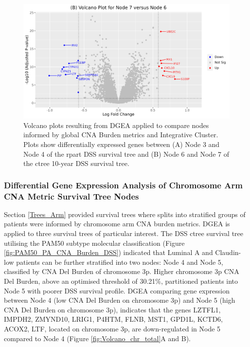 \begin{figure}[!ht]
\begin{center}
\begin{multicols}{2}
    \includegraphics[width=1\linewidth]{../figures/Chapter_4/Volcano_4.png}\par 
 
\end{multicols}
\caption[Volcano plots resulting from DGEA applied to compare nodes informed by global CNA Burden metrics and Integrative Cluster.]{Volcano plots resulting from DGEA applied to compare nodes informed by global CNA Burden metrics and Integrative Cluster. Plots show differentially expressed genes between (A) Node 3 and Node 4 of the rpart DSS survival tree and (B) Node 6 and Node 7 of the ctree 10-year DSS survival tree.}
\label{fig:DGEA_Global_VP_IC}
\end{center}
\end{figure}

\subsubsection{Differential Gene Expression Analysis of Chromosome Arm CNA Metric Survival Tree Nodes}
\label{Sec_limma_2}
Section \ref{Trees_Arm} provided survival trees where splits into stratified groups of patients were informed by chromosome arm CNA burden metrics. DGEA is applied to three survival trees of particular interest. The DSS ctree survival tree utilising the PAM50 subtype molecular classification (Figure \ref{fig:PAM50_PA_CNA_Burden_DSS}) indicated that Luminal A and Claudin-low patients can be further stratified into two nodes: Node 4 and Node 5, classified by CNA Del Burden of chromosome 3p. Higher chromosome 3p CNA Del Burden, above an optimised threshold of 30.21\%, partitioned patients into Node 5 with poorer DSS survival profile. DGEA comparing gene expression between Node 4 (low CNA Del Burden on chromosome 3p) and Node 5 (high CNA Del Burden on chromosome 3p), indicates that the genes LZTFL1, IMPDH2, ZMYND10, LRIG1, P4HTM, FLNB, MST1, GPD1L, KCTD6, ACOX2, LTF, located on chromosome 3p, are down-regulated in Node 5 compared to Node 4 (Figure \ref{fig:Volcano_chr_total}A and B). 

